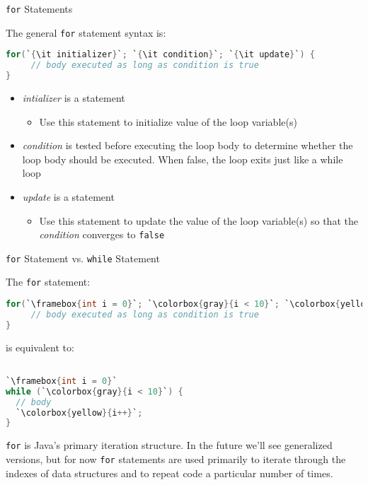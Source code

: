 \documentclass{beamer}
\begin{document}
\begin{frame}[fragile]{{\tt for} Statements}


The general {\tt for} statement syntax is:
\begin{lstlisting}[language=Java, escapechar=`]
for(`{\it initializer}`; `{\it condition}`; `{\it update}`) {
     // body executed as long as condition is true
}
\end{lstlisting}
\begin{itemize}
\item {\it intializer} is a statement
\begin{itemize}
\item Use this statement to initialize value of the loop variable(s)
\end{itemize}
\item {\it condition} is tested before executing the loop body to determine whether the loop body should be executed.  When false, the loop exits just like a while loop
\item {\it update} is a statement
\begin{itemize}
\item Use this statement to update the value of the loop variable(s) so that the {\it condition} converges to {\tt false}
\end{itemize}
\end{itemize}

\end{frame}

\begin{frame}[fragile]{{\tt for} Statement vs. {\tt while} Statement}


The {\tt for} statement:
\begin{lstlisting}[language=Java,escapechar=`]
for(`\framebox{int i = 0}`; `\colorbox{gray}{i < 10}`; `\colorbox{yellow}{i++}`) {
     // body executed as long as condition is true
}
\end{lstlisting}

is equivalent to:
\begin{lstlisting}[language=Java,escapechar=`]

`\framebox{int i = 0}`
while (`\colorbox{gray}{i < 10}`) {
  // body
  `\colorbox{yellow}{i++}`;
}
\end{lstlisting}


{\tt for} is Java's primary iteration structure.  In the future we'll see generalized versions, but for now {\tt for} statements are used primarily to iterate through the indexes of data structures and to repeat code a particular number of times.


\end{frame}
\end{document}

